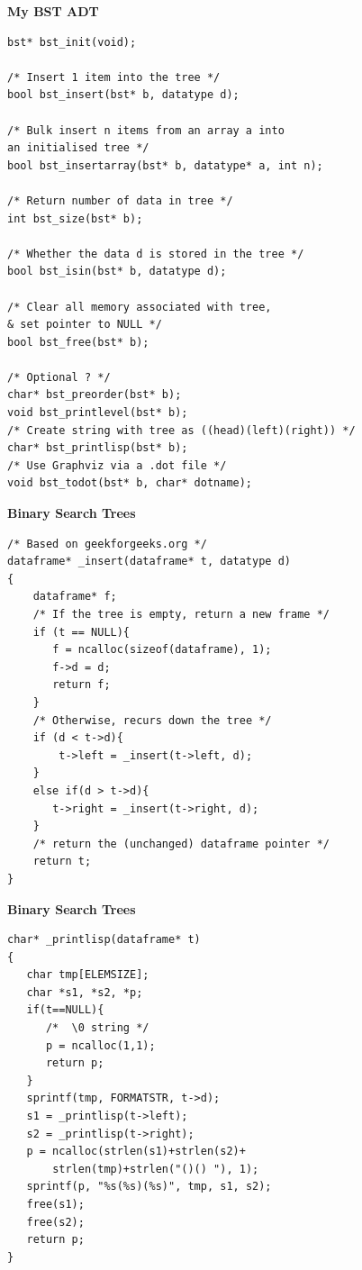 \newpage	
{\samepage	
\begin{center}	
{\Large{\bf My BST ADT}}	
\end{center}	
{\small	
\begin{verbatim}	
bst* bst_init(void);	

/* Insert 1 item into the tree */	
bool bst_insert(bst* b, datatype d);	

/* Bulk insert n items from an array a into
an initialised tree */	
bool bst_insertarray(bst* b, datatype* a, int n);	

/* Return number of data in tree */	
int bst_size(bst* b);	

/* Whether the data d is stored in the tree */	
bool bst_isin(bst* b, datatype d);	

/* Clear all memory associated with tree,
& set pointer to NULL */	
bool bst_free(bst* b);	

/* Optional ? */	
char* bst_preorder(bst* b);	
void bst_printlevel(bst* b);	
/* Create string with tree as ((head)(left)(right)) */	
char* bst_printlisp(bst* b);	
/* Use Graphviz via a .dot file */	
void bst_todot(bst* b, char* dotname);	
\end{verbatim}	
}}	

\newpage	
{\samepage	
\begin{center}	
{\Large{\bf Binary Search Trees}}	
\end{center}	
{\small
\begin{verbatim}	
/* Based on geekforgeeks.org */	
dataframe* _insert(dataframe* t, datatype d)	
{	
    dataframe* f;	
    /* If the tree is empty, return a new frame */	
    if (t == NULL){	
       f = ncalloc(sizeof(dataframe), 1);	
       f->d = d;	
       return f;	
    }	
    /* Otherwise, recurs down the tree */	
    if (d < t->d){	
        t->left = _insert(t->left, d);	
    }	
    else if(d > t->d){	
       t->right = _insert(t->right, d);	
    }	
    /* return the (unchanged) dataframe pointer */	
    return t;	
}	
\end{verbatim}	
}}

\newpage	
{\samepage	
\begin{center}	
{\Large{\bf Binary Search Trees}}	
\end{center}	
\begin{verbatim}	
char* _printlisp(dataframe* t)	
{	
   char tmp[ELEMSIZE];	
   char *s1, *s2, *p;	
   if(t==NULL){	
      /*  \0 string */	
      p = ncalloc(1,1);	
      return p;	
   }	
   sprintf(tmp, FORMATSTR, t->d);	
   s1 = _printlisp(t->left);	
   s2 = _printlisp(t->right);	
   p = ncalloc(strlen(s1)+strlen(s2)+
       strlen(tmp)+strlen("()() "), 1);	
   sprintf(p, "%s(%s)(%s)", tmp, s1, s2);	
   free(s1);	
   free(s2);	
   return p;	
}	
\end{verbatim}	
}

